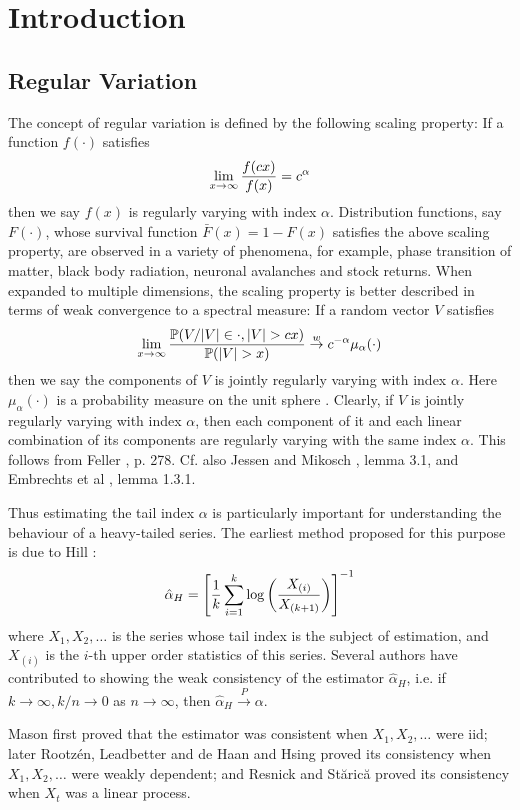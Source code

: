 \chapter{Introduction}\label{ch:intr}


\section{Regular Variation}
The concept of regular variation is defined by the following scaling
property: If a function $f(\cdot)$ satisfies
\[
\lim_{x \to \infty} {f(c x) \over f(x)} = c^\alpha
\]
then we say $f(x)$ is regularly varying with index $\alpha$.
Distribution functions, say $F(\cdot)$, whose survival function
$\bar F(x) = 1 - F(x)$ satisfies the above scaling property, are
observed in a variety of phenomena, for example, phase transition of
matter, black body radiation, neuronal avalanches and stock returns.
When expanded to multiple dimensions, the scaling property is better
described in terms of weak convergence to a spectral measure: If a
random vector $V$ satisfies
\[
\lim_{x \to \infty}
{
  \P(V/|V| \in \cdot, |V| > c x)
  \over
  \P(|V| > x)
}
\overset{w}{\to} c^{-\alpha} \mu_\alpha(\cdot)
\]
then we say the components of $V$ is jointly regularly varying with
index $\alpha$. Here $\mu_\alpha(\cdot)$ is a probability measure on
the unit sphere \cite{buraczewski:damek:mikosch:2016}. Clearly, if $V$
is jointly regularly varying with index $\alpha$, then each component
of it and each linear combination of its components are regularly
varying with the same index $\alpha$. This follows from Feller
\cite{feller}, p. 278. Cf. also Jessen and Mikosch
\cite{JessenMikosch2006}, lemma 3.1, and Embrechts et al
\cite{embrechts:klueppelberg:mikosch:1997}, lemma 1.3.1.

Thus estimating the tail index $\alpha$ is particularly important for
understanding the behaviour of a heavy-tailed series. The earliest
method proposed for this purpose is due to Hill \cite{hill1975simple}:
\[
\hat \alpha_H = \left[
  {1 \over k} \sum_{i=1}^k \log \left(
  X_{(i)} \over X_{(k+1)}
  \right)
  \right]^{-1}
\]
where $X_1, X_2, \dots$ is the series whose tail index is the subject
of estimation, and $X_{(i)}$ is the $i$-th upper order statistics of
this series. Several authors have contributed to showing the
weak consistency of the estimator $\hat \alpha_H$,
i.e. if $k \to \infty, k/n \to 0$ as $n \to \infty$, then
$\hat \alpha_H \overset{P}{\to} \alpha$.

Mason \cite{mason:1982} first proved that the estimator
was consistent when $X_1, X_2, \dots$ were iid; later Rootz\'en,
Leadbetter and de Haan \cite{rootzen:leadbetter:dehaan1992} and Hsing
\cite{hsing:1991} proved its consistency when $X_1, X_2, \dots$ were
weakly dependent; and Resnick and St{\u a}ric{\u a}
\cite{resnick:starica:1995, resnick:starica:1997} proved its
consistency when $X_t$ was a linear process.





